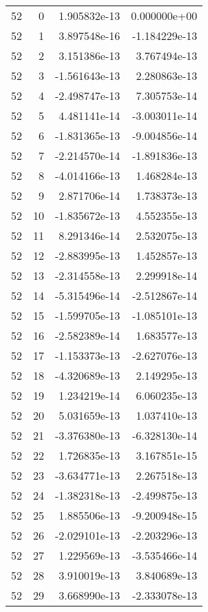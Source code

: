 \begin{tabular}{rrrr}
  52 &    0 &  1.905832e-13 &  0.000000e+00 \\
  52 &    1 &  3.897548e-16 & -1.184229e-13 \\
  52 &    2 &  3.151386e-13 &  3.767494e-13 \\
  52 &    3 & -1.561643e-13 &  2.280863e-13 \\
  52 &    4 & -2.498747e-13 &  7.305753e-14 \\
  52 &    5 &  4.481141e-14 & -3.003011e-14 \\
  52 &    6 & -1.831365e-13 & -9.004856e-14 \\
  52 &    7 & -2.214570e-14 & -1.891836e-13 \\
  52 &    8 & -4.014166e-13 &  1.468284e-13 \\
  52 &    9 &  2.871706e-14 &  1.738373e-13 \\
  52 &   10 & -1.835672e-13 &  4.552355e-13 \\
  52 &   11 &  8.291346e-14 &  2.532075e-13 \\
  52 &   12 & -2.883995e-13 &  1.452857e-13 \\
  52 &   13 & -2.314558e-13 &  2.299918e-14 \\
  52 &   14 & -5.315496e-14 & -2.512867e-14 \\
  52 &   15 & -1.599705e-13 & -1.085101e-13 \\
  52 &   16 & -2.582389e-14 &  1.683577e-13 \\
  52 &   17 & -1.153373e-13 & -2.627076e-13 \\
  52 &   18 & -4.320689e-13 &  2.149295e-13 \\
  52 &   19 &  1.234219e-14 &  6.060235e-13 \\
  52 &   20 &  5.031659e-13 &  1.037410e-13 \\
  52 &   21 & -3.376380e-13 & -6.328130e-14 \\
  52 &   22 &  1.726835e-13 &  3.167851e-15 \\
  52 &   23 & -3.634771e-13 &  2.267518e-13 \\
  52 &   24 & -1.382318e-13 & -2.499875e-13 \\
  52 &   25 &  1.885506e-13 & -9.200948e-15 \\
  52 &   26 & -2.029101e-13 & -2.203296e-13 \\
  52 &   27 &  1.229569e-13 & -3.535466e-14 \\
  52 &   28 &  3.910019e-13 &  3.840689e-13 \\
  52 &   29 &  3.668990e-13 & -2.333078e-13 \\

\end{tabular}
